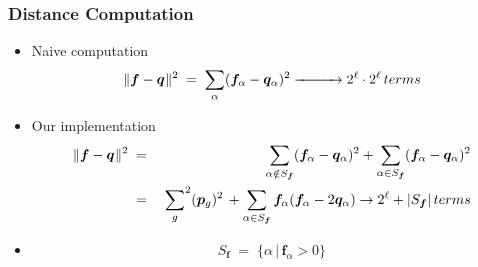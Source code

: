 \documentclass[aspectratio=169]{beamer}
\begin{document}
  \begin{frame}
    \frametitle{Distance Computation}
    \begin{itemize}      
      \item{Naive computation 
      \[
	\|{\bm f} - {\bm q} \hspace{0.005in} \|^2 \; = \;
	  {\sum_{\alpha}} ({\bm f}_\alpha-{\bm q}_\alpha)^2 
	   \xrightarrow{\hspace*{1cm}} 2^\ell \cdot 2^\ell \, terms 
	\]}
      \item{Our implementation
	\begin{eqnarray*}
	  \|{\bm f} - {\bm q} \hspace{0.005in} \|^2 \; &=& \;
	\sum_{\alpha \notin {S_{\bm f}}} ({\bm f}_\alpha-{\bm q}_\alpha)^2 +
	\sum_{\alpha \in {S_{\bm f}}} ({\bm f}_\alpha-{\bm q}_\alpha)^2 \\	  
	  &=& \; {\sum_{g}}^2 ({\bm p}_{g})^2 \, +
	  \sum_{\alpha \in {S_{\bm f}}} {\bm f}_\alpha ({\bm f}_\alpha- 2 {\bm q}_\alpha) \to 2^\ell + |S_{\bm f}| \, terms 
	\end{eqnarray*}
      }
      \item{\[
	      S_{\bm f} \; = \; \{ \alpha \, | \, {\bm f}_\alpha > 0 \}
	      \]
      }
    \end{itemize}
  \end{frame}
  
\end{document}

